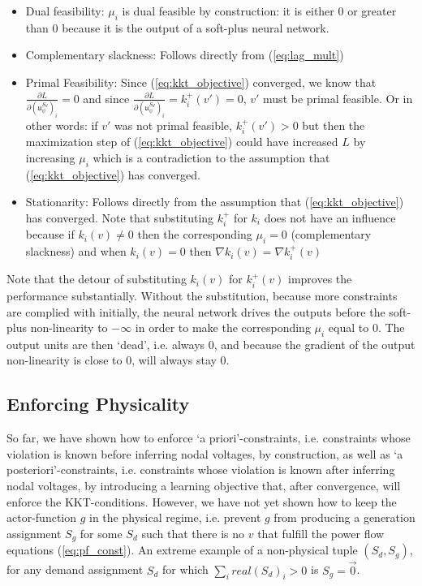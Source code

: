 \begin{itemize}
\item Dual feasibility: $\mu_i$ is dual feasible by construction: it is either $0$ or greater than $0$ because it is the output of a soft-plus neural network.
\item Complementary slackness: Follows directly from (\ref{eq:lag_mult})
\item Primal Feasibility: Since (\ref{eq:kkt_objective}) converged, we know that $\frac{\partial L}{\partial (\mathfrak{u}_\psi^{S_d})_i} = 0$ and since $\frac{\partial L}{\partial (\mathfrak{u}_\psi^{S_d})_i} = k^+_i(v') = 0$, $v'$ must be primal feasible. Or in other words: if $v'$ was not primal feasible, $k^+_i(v') > 0$ but then the maximization step of (\ref{eq:kkt_objective}) could have increased $L$ by increasing $\mu_i$ which is a contradiction to the assumption that (\ref{eq:kkt_objective}) has converged.
\item Stationarity: Follows directly from the assumption that (\ref{eq:kkt_objective}) has converged. Note that substituting $k^+_i$ for $k_i$ does not have an influence because if $k_i(v) \neq 0$ then the corresponding $\mu_i = 0$ (complementary slackness) and when $k_i(v) = 0$ then $\nabla k_i(v) = \nabla k_i^+(v)$
\end{itemize}

Note that the detour of substituting $k_i(v)$ for $k_i^+(v)$ improves the performance substantially. Without the substitution, because more constraints are complied with initially, the neural network drives the outputs before the soft-plus non-linearity to $-\infty$ in order to make the corresponding $\mu_i$ equal to 0. The output units are then `dead', i.e. always 0, and because the gradient of the output non-linearity is close to 0, will always stay 0.

\subsection{Enforcing Physicality}
\label{sec:enforcing_phys}
So far, we have shown how to enforce `a priori'-constraints, i.e. constraints whose violation is known before inferring nodal voltages, by construction, as well as `a posteriori'-constraints, i.e. constraints whose violation is known after inferring nodal voltages, by introducing a learning objective that, after convergence, will enforce the KKT-conditions. However, we have not yet shown how to keep the actor-function $g$ in the physical regime, i.e. prevent $g$ from producing a generation assignment $S_g$ for some $S_d$ such that there is no $v$ that fulfill the power flow equations (\ref{eq:pf_const}). An extreme example of a non-physical tuple $(S_d, S_g)$, for any demand assignment $S_d$ for which $\sum_i real(S_d)_i > 0$ is $S_g = \vec{0}$. 

